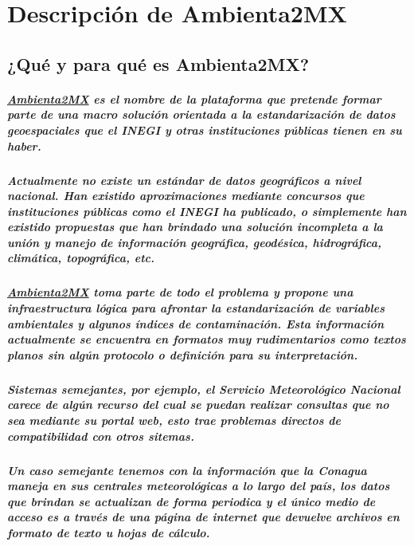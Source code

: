 \chapter {Descripción de Ambienta2MX}
  \section {¿Qué y para qué es Ambienta2MX?}
    \paragraph {\underline{Ambienta2MX} es el nombre de la plataforma que pretende formar parte de una macro solución orientada a la estandarización de datos geoespaciales que el INEGI y otras instituciones públicas tienen en su haber.}
    \paragraph{Actualmente no existe un estándar de datos geográficos a nivel nacional. Han existido aproximaciones mediante concursos que instituciones públicas como el INEGI ha publicado, o simplemente han existido propuestas que han brindado una solución incompleta a la unión y manejo de información geográfica, geodésica, hidrográfica, climática, topográfica, etc.}
    \paragraph{\underline{Ambienta2MX} toma parte de todo el problema y propone una infraestructura lógica para afrontar la estandarización de variables ambientales y algunos índices de contaminación. Esta información actualmente se encuentra en formatos muy rudimentarios como textos planos sin algún protocolo o definición para su interpretación.}
    \paragraph{Sistemas semejantes, por ejemplo, el \textbf{Servicio Meteorológico Nacional} carece de algún recurso del cual se puedan realizar consultas que no sea mediante su portal web, esto trae problemas directos de compatibilidad con otros sitemas.}
    \paragraph{Un caso semejante tenemos con la información que la \textbf{Conagua} maneja en sus centrales meteorológicas a lo largo del país, los datos que brindan se actualizan de forma periodica y el único medio de acceso es a través de una página de internet que devuelve archivos en formato de texto u hojas de cálculo.}

